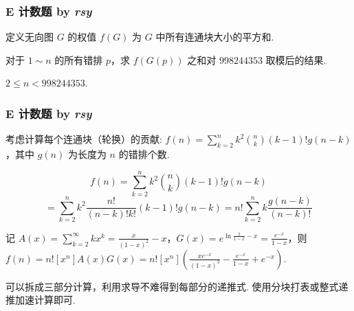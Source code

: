 \frame
{
  \frametitle{E 计数题 by \itshape rsy}

 	定义无向图 $G$ 的权值 $f(G)$ 为 $G$ 中所有连通块大小的平方和.

	对于 $1 \sim n$ 的所有错排 $p$，求 $f(G(p))$ 之和对 $998244353$ 取模后的结果.

	 $2 \le n < 998244353$.

}
\frame
{
  \frametitle{E 计数题 by \itshape rsy}

 	考虑计算每个连通块（轮换）的贡献: $f(n)=\sum_{k=2}^n k^2 \binom n k (k-1)! g(n-k)$，其中 $g(n)$ 为长度为 $n$ 的错排个数. \pause

	$$f(n)=\sum_{k=2}^n k^2 \binom n k (k-1)! g(n-k)$$
	$$=\sum_{k=2}^n k^2 \frac {n!}{(n-k)!k!} (k-1)! g(n-k)=n!\sum_{k=2}^n k \frac {g(n-k)}{(n-k)!}$$

	记 $A(x)=\sum_{k=2}^\infty kx^k =\frac {x}{(1-x)^2}-x$，$G(x)=e^{\ln \frac 1 {1-x}-x}=\frac {e^{-x}}{1-x}$，则 $f(n) =n![x ^ n]A(x)G(x) = n![x ^ n]\left(\frac {xe^{-x}}{(1-x)^3} - \frac {e^{-x}}{1-x}+e^{-x}\right)$. \pause

	可以拆成三部分计算，利用求导不难得到每部分的递推式. 使用分块打表或整式递推加速计算即可.

}